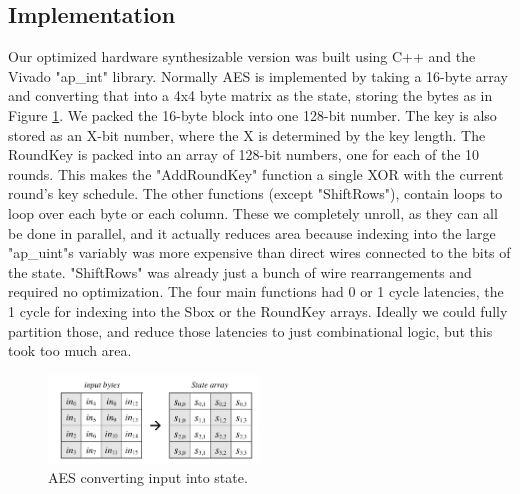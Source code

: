 \subsection{Implementation}
Our optimized hardware synthesizable version was built using C++ and the Vivado "ap_int" library.
Normally AES is implemented by taking a 16-byte array and converting that into a 4x4 byte matrix as the state, storing the bytes as in Figure \ref{fig:aesstate}.
We packed the 16-byte block into one 128-bit number. The key is also stored as an X-bit number, where the X is determined by the key length.
The RoundKey is packed into an array of 128-bit numbers, one for each of the 10 rounds.
This makes the "AddRoundKey" function a single XOR with the current round's key schedule.
The other functions (except "ShiftRows"), contain loops to loop over each byte or each column.
These we completely unroll, as they can all be done in parallel, and it actually reduces area because indexing into the large "ap_uint"s variably was more expensive than direct wires connected to the bits of the state.
"ShiftRows" was already just a bunch of wire rearrangements and required no optimization.
The four main functions had 0 or 1 cycle latencies, the 1 cycle for indexing into the Sbox or the RoundKey arrays.
Ideally we could fully partition those, and reduce those latencies to just combinational logic, but this took too much area.

\begin{figure}[h]
\centering
\includegraphics[width=0.5\textwidth]{aesstate}
\caption{AES converting input into state.}
\label{fig:aesstate}
\end{figure}


